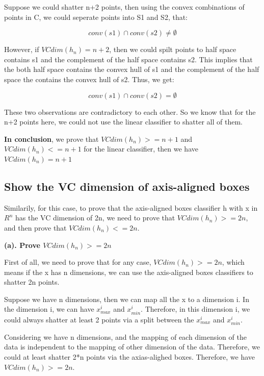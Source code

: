 \documentclass{article} %
\begin{document}
Suppose we could shatter n+2 points, then using the convex combinations of
points in C, we could seperate points into S1 and S2, that:

\begin{equation}
conv(s1) \cap conv(s2) \neq \emptyset
\end{equation}

However, if $VCdim(h_n) = n+2$, then we could spilt points to half space
contains s1 and the complement of the half space contains s2. This implies that
the both half space contains the convex hull of s1 and the complement of the
half space the contains the convex hull of s2. Thus, we get:

\begin{equation}
conv(s1) \cap conv(s2) = \emptyset
\end{equation}

These two observations are contradictory to each other. So we know that for the
n+2 points here, we could not use the linear classifier to shatter all of them.

\textbf{In conclusion}, we prove that $VCdim(h_n) >= n+1$ and $VCdim(h_n) <= n+1$ for the
linear classifier, then we have $VCdim(h_n) = n+1$


\subsection{Show the VC dimension of axis-aligned boxes}

Similarily, for this case, to prove that the axis-aligned boxes classifier h
with x in $ R^n $ has the VC dimension of 2n, we need to prove that
$VCdim(h_n) >= 2n$, and then prove that $VCdim(h_n) <= 2n$.

\textbf{(a). Prove $VCdim(h_n) >= 2n$}

First of all, we need to prove that for any case, $VCdim(h_n) >= 2n$, which
means if the x has n dimensions, we can use the axis-aligned boxes classifiers
to shatter 2n points.

Suppose we have n dimensions, then we can map all the x to a dimension i. In the
dimension i, we can have $x^i_{max}$ and $x^i_{min}$. Therefore, in this
dimension i, we could always shatter at least 2 points via a split between the
$x^i_{max}$ and $x^i_{min}$.

Considering we have n dimensions, and the mapping of each dimension of the data is
independent to the mapping of other dimension of the data. Therefore, we could
at least shatter 2*n points via the axias-alighed boxes. Therefore, we have
$VCdim(h_n) >= 2n$.
\end{document}
